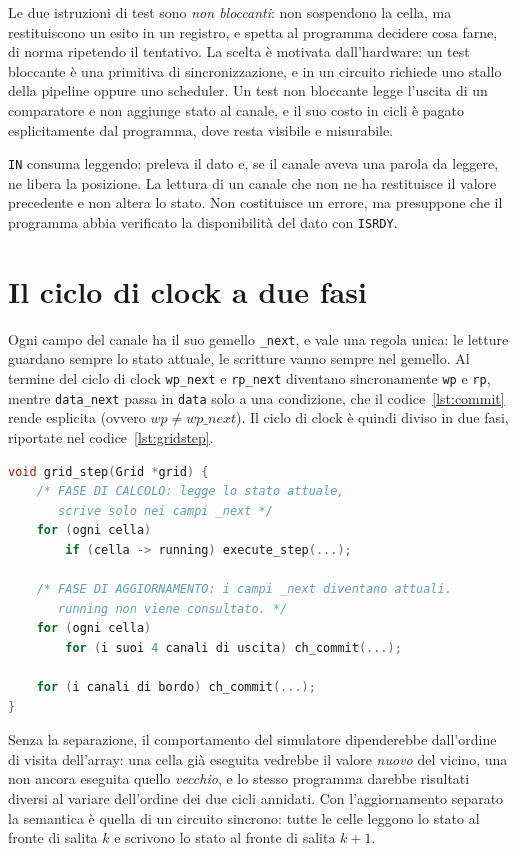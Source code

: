 Le due istruzioni di test sono \emph{non bloccanti}: non sospendono la cella,
ma restituiscono un esito in un registro, e spetta al programma decidere cosa
farne, di norma ripetendo il tentativo. La scelta è motivata dall'hardware: un
test bloccante è una primitiva di sincronizzazione, e in un circuito richiede
uno stallo della pipeline oppure uno scheduler. Un test non bloccante legge
l'uscita di un comparatore e non aggiunge stato al canale, e il suo costo in
cicli è pagato esplicitamente dal programma, dove resta visibile e misurabile.

\texttt{IN} consuma leggendo: preleva il dato e, se il canale aveva una parola da leggere,
ne libera la posizione. La lettura di un canale che non ne ha restituisce il
valore precedente e non altera lo stato. Non costituisce un errore, ma presuppone che il programma
abbia verificato la disponibilità del dato con \texttt{ISRDY}.

\section{Il ciclo di clock a due fasi}
\label{sec:due-fasi}

Ogni campo del canale ha il suo gemello \texttt{\_next}, e vale una regola
unica: le letture guardano sempre lo stato attuale, le scritture vanno sempre
nel gemello. Al termine del ciclo di clock \texttt{wp\_next} e \texttt{rp\_next}
diventano sincronamente \texttt{wp} e \texttt{rp}, mentre \texttt{data\_next}
passa in \texttt{data} solo a una condizione, che il codice~\ref{lst:commit}
rende esplicita (ovvero $wp \neq wp\_next$). Il ciclo di clock è quindi diviso in due fasi, riportate nel
codice~\ref{lst:gridstep}.


\begin{lstlisting}[caption={Il ciclo di clock globale, che il simulatore esegue a ogni passo},label={lst:gridstep},language=C,float=htbp]
void grid_step(Grid *grid) {
    /* FASE DI CALCOLO: legge lo stato attuale,
       scrive solo nei campi _next */
    for (ogni cella)
        if (cella -> running) execute_step(...);

    /* FASE DI AGGIORNAMENTO: i campi _next diventano attuali.
       running non viene consultato. */
    for (ogni cella)
        for (i suoi 4 canali di uscita) ch_commit(...);

    for (i canali di bordo) ch_commit(...);
}
\end{lstlisting}

Senza la separazione, il comportamento del simulatore dipenderebbe dall'ordine di visita
dell'array: una cella già eseguita vedrebbe il valore \emph{nuovo} del vicino,
una non ancora eseguita quello \emph{vecchio}, e lo stesso programma darebbe
risultati diversi al variare dell'ordine dei due cicli annidati. Con
l'aggiornamento separato la semantica è quella di un circuito sincrono:
tutte le celle leggono lo stato al fronte di salita $k$ e scrivono lo stato al
fronte di salita $k+1$.

